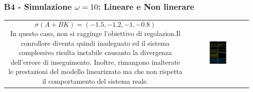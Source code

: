 \documentclass{beamer}
\begin{document}
\begin{frame}
	\frametitle{B4 - Simulazione \(\omega=10 \): Lineare e Non linerare}%
	\begin{tabular}{cc}
		\begin{minipage}{0.45\textwidth}
			\begin{equation*}
				\sigma(A+BK)=(-1.5,-1.2,-1,-0.8)
			\end{equation*}
			In questo caso, non si ragginge l'obiettivo di regolazion.\newline Il conrollore diventa quindi inadeguato ed il sistema complessivo risulta instabile causanto la divergenza dell'errore di inseguimento.\newline
			Inoltre, rimangono inalterate le prestazioni del modello linearizzato ma che non rispetta il comportamento del sistema reale.
		\end{minipage}
		&
		\begin{minipage}{0.45\textwidth}
			\begin{figure}
				\includegraphics[scale=0.55]{2022-06-20-13-27-00.png}%
			\end{figure}
		\end{minipage}
	\end{tabular}
\end{frame}
\end{document}
